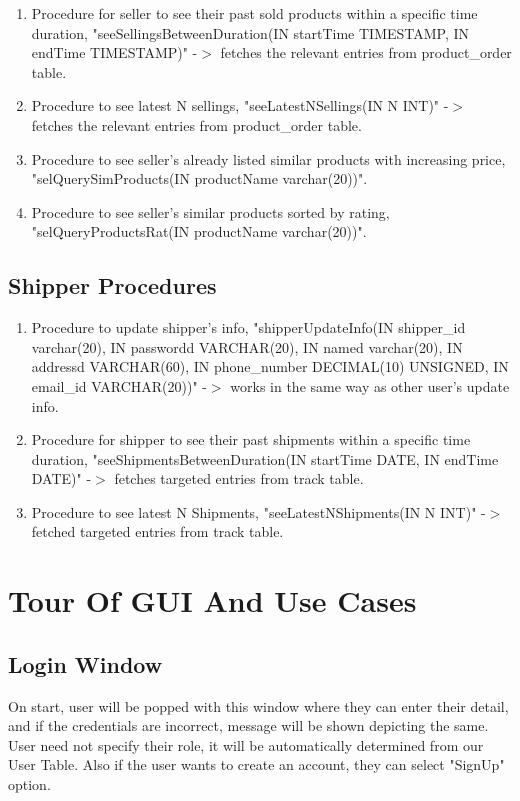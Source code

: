 \documentclass[a4paper,12pt]{article}
\begin{document}
\begin{enumerate}
  \item Procedure for seller to see their past sold products within a specific time duration, "seeSellingsBetweenDuration(IN startTime TIMESTAMP, IN endTime TIMESTAMP)" -$>$ fetches the relevant entries from product\_order table.
  \item Procedure to see latest N sellings, "seeLatestNSellings(IN N INT)" -$>$ fetches the relevant entries from product\_order table.
  \item Procedure to see seller's already listed similar products with increasing price, "selQuerySimProducts(IN productName varchar(20))".
  \item Procedure to see seller's similar products sorted by rating, "selQueryProductsRat(IN productName varchar(20))".
\end{enumerate}
\subsection{Shipper Procedures}
\begin{enumerate}
  \item Procedure to update shipper's info, "shipperUpdateInfo(IN shipper\_id varchar(20), IN passwordd VARCHAR(20), IN named varchar(20), IN addressd VARCHAR(60), IN phone\_number DECIMAL(10) UNSIGNED, IN email\_id VARCHAR(20))" -$>$ works in the same way as other user's update info.
  \item Procedure for shipper to see their past shipments within a specific time duration, "seeShipmentsBetweenDuration(IN startTime DATE, IN endTime DATE)" -$>$ fetches targeted entries from track table.
  \item Procedure to see latest N Shipments, "seeLatestNShipments(IN N INT)" -$>$ fetched targeted entries from track table.
\end{enumerate}

\section{Tour Of GUI And Use Cases}
\subsection{Login Window}
On start, user will be popped with this window where they can enter their detail, and if the credentials are incorrect, message will be shown depicting the same. User need not specify their role, it will be automatically determined from our User Table. Also if the user wants to create an account, they can select "SignUp" option.
\end{document}

